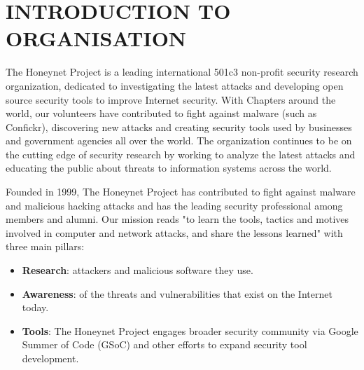 \newpage
\thispagestyle{empty}
\chapter{INTRODUCTION TO ORGANISATION}

 The Honeynet Project \cite{b4} is a leading international 501c3 non-profit security research organization, dedicated to investigating the latest attacks and developing open source security tools to improve Internet security. With Chapters around the world, our volunteers have contributed to fight against malware (such as Confickr), discovering new attacks and creating security tools used by businesses and government agencies all over the world. The organization continues to be on the cutting edge of security research by working to analyze the latest attacks and educating the public about threats to information systems across the world.

Founded in 1999, The Honeynet Project has contributed to fight against malware and malicious hacking attacks and has the leading security professional among members and alumni. Our mission reads "to learn the tools, tactics and motives involved in computer and network attacks, and share the lessons learned" with three main pillars:


\begin{itemize}
  \item \textbf{Research}: attackers and malicious software they use.
  \item \textbf{Awareness}: of the threats and vulnerabilities that exist on the Internet today.
  \item \textbf{Tools}: The Honeynet Project engages broader security community via Google Summer of Code (GSoC) and other efforts to expand security tool development. 
\end{itemize}
\vfill